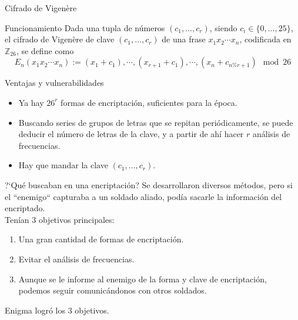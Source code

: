 \documentclass[aspectratio=169]{beamer}
\begin{document}
\begin{frame}{Cifrado de Vigenère}
	\begin{block}{Funcionamiento}
		Dada una tupla de números $(c_1, ..., c_r)$, siendo $c_i\in \{0, ..., 25\}$, el cifrado de Vigenère de clave $(c_1, ..., c_r)$ de una frase $x_1x_2\cdots x_n$, codificada en $\mathbb Z_{26}$, se define como
  $$E_n(x_1x_2\cdots x_n) := (x_1+c_1), \cdots, (x_{r+1}+c_1), \cdots, (x_n + c_{n \% r+1}) \mod 26$$
	\end{block}
 
	\begin{block}{Ventajas y vulnerabilidades}
		\begin{itemize}
			 \pause \item Ya hay $26^r$ formas de encriptación, suficientes para la época.
			 \pause \item Buscando series de grupos de letras que se repitan periódicamente, se puede deducir el número de letras de la clave, y a partir de ahí hacer $r$ análisis de frecuencias.
                 \pause \item Hay que mandar la clave $(c_1, ..., c_r)$.
		\end{itemize}
	\end{block}


\end{frame}

\begin{frame}{?`Qué buscaban en una encriptación?}
    Se desarrollaron diversos métodos, pero si el ``enemigo`` capturaba a un soldado aliado, podía sacarle la información del encriptado.\pause \\  
    Tenían 3 objetivos principales:
	\begin{enumerate}
	     \pause \item Una gran cantidad de formas de encriptación.
             \pause \item Evitar el análisis de frecuencias.
             \pause \item Aunque se le informe al enemigo de la forma y clave de encriptación, podemos seguir comunicándonos con otros soldados.
	\end{enumerate}
    Enigma logró los 3 objetivos.

\end{frame}

\end{document}
